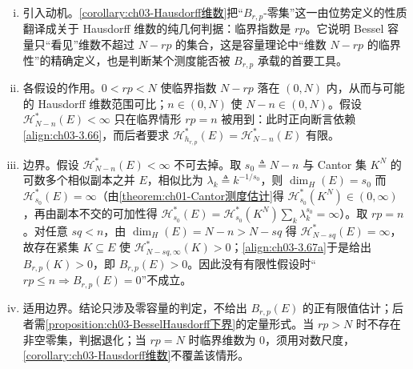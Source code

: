 \documentclass[../../main.tex]{subfiles}%
\begin{document}
\begin{remark}\label{remark:ch03-Hausdorff维数判别}
\begin{enumerate}[(i)]
\item 引入动机。\cref{corollary:ch03-Hausdorff维数}把“$B_{r,p}$-零集”这一由位势定义的性质翻译成关于 Hausdorff 维数的纯几何判据：临界指数是 $rp$。它说明 Bessel 容量只“看见”维数不超过 $N-rp$ 的集合，这是容量理论中“维数 $N-rp$ 的临界性”的精确定义，也是判断某个测度能否被 $B_{r,p}$ 承载的首要工具。
\item 各假设的作用。$0<rp<N$ 使临界指数 $N-rp$ 落在 $(0,N)$ 内，从而与可能的 Hausdorff 维数范围可比；$n\in(0,N)$ 使 $N-n\in(0,N)$。假设 $\mathcal{H}^*_{N-n}(E)<\infty$ 只在临界情形 $rp=n$ 被用到：此时正向断言依赖\eqref{align:ch03-3.66}，而后者要求 $\mathcal{H}^*_{h_{r,p}}(E)=\mathcal{H}^*_{N-n}(E)$ 有限。
\item 边界。假设 $\mathcal{H}^*_{N-n}(E)<\infty$ 不可去掉。取 $s_0\triangleq N-n$ 与 Cantor 集 $K^N$ 的可数多个相似副本之并 $E$，相似比为 $\lambda_k\triangleq k^{-1/s_0}$，则 $\dim_H(E)=s_0$ 而 $\mathcal{H}^*_{s_0}(E)=\infty$（由\cref{theorem:ch01-Cantor测度估计}得 $\mathcal{H}^*_{s_0}(K^N)\in(0,\infty)$，再由副本不交的可加性得 $\mathcal{H}^*_{s_0}(E)=\mathcal{H}^*_{s_0}(K^N)\sum_k\lambda_k^{s_0}=\infty$）。取 $rp=n$。对任意 $sq<n$，由 $\dim_H(E)=N-n>N-sq$ 得 $\mathcal{H}^*_{N-sq}(E)=\infty$，故存在紧集 $K\subseteq E$ 使 $\mathcal{H}^*_{N-sq,\infty}(K)>0$；\eqref{align:ch03-3.67a}于是给出 $B_{r,p}(K)>0$，即 $B_{r,p}(E)>0$。因此没有有限性假设时“$rp\leqslant n\Rightarrow B_{r,p}(E)=0$”不成立。
\item 适用边界。结论只涉及零容量的判定，不给出 $B_{r,p}(E)$ 的正有限值估计；后者需\cref{proposition:ch03-BesselHausdorff下界}的定量形式。当 $rp>N$ 时不存在非空零集，判据退化；当 $rp=N$ 时临界维数为 $0$，须用对数尺度，\cref{corollary:ch03-Hausdorff维数}不覆盖该情形。
\end{enumerate}
\end{remark}
\end{document}
